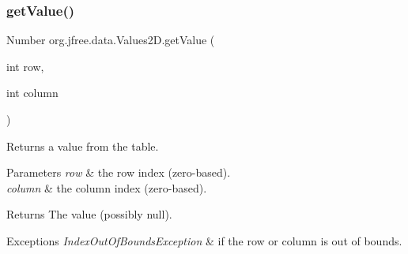 \mbox{\label{interfaceorg_1_1jfree_1_1data_1_1_values2_d_a0797937d3ac62e18b300eef1fe906ec6}} 
\subsubsection{\texorpdfstring{get\+Value()}{getValue()}}
{\footnotesize\ttfamily Number org.\+jfree.\+data.\+Values2\+D.\+get\+Value (\begin{DoxyParamCaption}\item[{int}]{row,  }\item[{int}]{column }\end{DoxyParamCaption})}

Returns a value from the table.


\begin{DoxyParams}{Parameters}
{\em row} & the row index (zero-\/based). \\
\hline
{\em column} & the column index (zero-\/based).\\
\hline
\end{DoxyParams}
\begin{DoxyReturn}{Returns}
The value (possibly {\ttfamily null}).
\end{DoxyReturn}

\begin{DoxyExceptions}{Exceptions}
{\em Index\+Out\+Of\+Bounds\+Exception} & if the {\ttfamily row} or {\ttfamily column} is out of bounds. \\
\hline
\end{DoxyExceptions}


